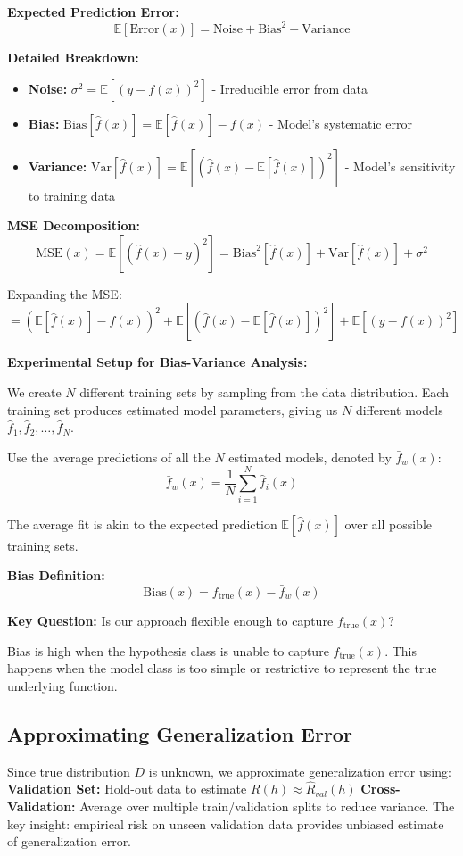 \documentclass{article}
\begin{document}
\textbf{Expected Prediction Error:}
\[
\mathbb{E}[\text{Error}(x)] = \text{Noise} + \text{Bias}^2 + \text{Variance}
\]

\textbf{Detailed Breakdown:}
\begin{itemize}
    \item \textbf{Noise:} $\sigma^2 = \mathbb{E}[(y - f(x))^2]$ - Irreducible error from data
    \item \textbf{Bias:} $\text{Bias}[\hat{f}(x)] = \mathbb{E}[\hat{f}(x)] - f(x)$ - Model's systematic error
    \item \textbf{Variance:} $\text{Var}[\hat{f}(x)] = \mathbb{E}[(\hat{f}(x) - \mathbb{E}[\hat{f}(x)])^2]$ - Model's sensitivity to training data
\end{itemize}

\textbf{MSE Decomposition:}
\[
\text{MSE}(x) = \mathbb{E}[(\hat{f}(x) - y)^2] = \text{Bias}^2[\hat{f}(x)] + \text{Var}[\hat{f}(x)] + \sigma^2
\]

Expanding the MSE:
\[
= (\mathbb{E}[\hat{f}(x)] - f(x))^2 + \mathbb{E}[(\hat{f}(x) - \mathbb{E}[\hat{f}(x)])^2] + \mathbb{E}[(y - f(x))^2]
\]

\textbf{Experimental Setup for Bias-Variance Analysis:}

We create $N$ different training sets by sampling from the data distribution. Each training set produces estimated model parameters, giving us $N$ different models $\hat{f}_1, \hat{f}_2, \ldots, \hat{f}_N$.

Use the average predictions of all the $N$ estimated models, denoted by $\bar{f}_w(x)$:
\[
\bar{f}_w(x) = \frac{1}{N}\sum_{i=1}^{N} \hat{f}_i(x)
\]

The average fit is akin to the expected prediction $\mathbb{E}[\hat{f}(x)]$ over all possible training sets.

\textbf{Bias Definition:}
\[
\text{Bias}(x) = f_{\text{true}}(x) - \bar{f}_w(x)
\]

\textbf{Key Question:} Is our approach flexible enough to capture $f_{\text{true}}(x)$?

Bias is high when the hypothesis class is unable to capture $f_{\text{true}}(x)$. This happens when the model class is too simple or restrictive to represent the true underlying function.

\subsection{Approximating Generalization Error}
Since true distribution $D$ is unknown, we approximate generalization error using:
\textbf{Validation Set:} Hold-out data to estimate $R(h) \approx \hat{R}_{val}(h)$
\textbf{Cross-Validation:} Average over multiple train/validation splits to reduce variance.
The key insight: empirical risk on unseen validation data provides unbiased estimate of generalization error.
\end{document}

